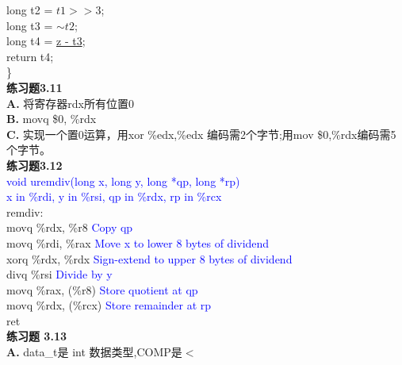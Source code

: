 \documentclass{article}
\newcommand{\blue}[1]{\textcolor{blue}{#1}}
\begin{document}
\begin{CJK}{UTF8}{uyhei}
\hspace*{2em}	long t2 = \underline{$t1 >> 3$};	\\
\hspace*{2em}	long t3 = \underline{$\sim{t2}$};	\\
\hspace*{2em}	long t4 = \underline{z - t3};	\\
\hspace*{2em}	return t4;	\\
\}	\\[3ex]
\textbf{练习题3.11}	\\[2ex]
\textbf{A.} 将寄存器rdx所有位置0	\\
\textbf{B.} movq \$0, \%rdx	\\
\textbf{C.} 实现一个置0运算，用xor \%edx,\%edx 编码需2个字节;用mov \$0,\%rdx编码需5个字节。	\\[3ex]
\textbf{练习题3.12}	\\[2ex]
\blue{void uremdiv(long x, long y, long *qp, long *rp)}	\\
\blue{x in \%rdi, y in \%rsi, qp in \%rdx, rp in \%rcx}	\\
remdiv:	\\
\hspace*{2em}	movq	\%rdx, \%r8	\hspace*{2em}\blue{Copy qp}	\\
\hspace*{2em}	movq	\%rdi, \%rax	\hspace*{1.7em}\blue{Move x to lower 8 bytes of dividend}	\\
\hspace*{2em}	xorq	\%rdx, \%rdx	\hspace*{1.8em}\blue{Sign-extend to upper 8 bytes of dividend}	\\
\hspace*{2em}	divq	\%rsi		\hspace*{5.2em}\blue{Divide by y}	\\
\hspace*{2em}	movq 	\%rax, (\%r8)	\hspace*{1.3em}\blue{Store quotient at qp}	\\
\hspace*{2em}	movq	\%rdx, (\%rcx)	\hspace*{0.8em}\blue{Store remainder at rp}	\\
\hspace*{2em}	ret	\\[3ex]
\textbf{练习题 3.13}	\\[2ex]
\textbf{A.} data\_t是 int 数据类型,COMP是$<$	\\

\end{CJK}
\end{document}
